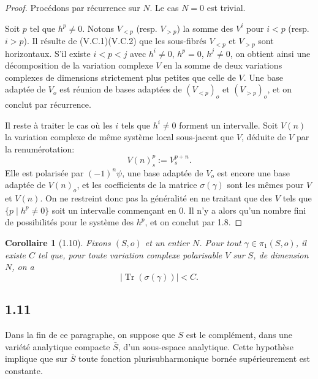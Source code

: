 \documentclass[12pt,a4paper]{article}
\theoremstyle{plain}
\newtheorem{corollary}{Corollaire}[section]
\theoremstyle{definition}
\DeclareMathOperator{\Tr}{Tr}
\begin{document}
\begin{proof}
Proc\'{e}dons par r\'{e}currence sur $N$. Le cas $N = 0$ est trivial.

Soit $p$ tel que $h^{p} \neq 0$. Notons $V_{<p}$ (resp. $V_{>p}$) la somme des $V^{i}$ pour $i < p$ (resp. $i > p$). Il r\'{e}sulte de (V.C.1)(V.C.2) que les sous-fibr\'{e}s $V_{<p}$ et $V_{>p}$ sont horizontaux. S'il existe $i < p < j$ avec $h^{i} \neq 0$, $h^{p} = 0$, $h^{j} \neq 0$, on obtient ainsi une d\'{e}composition de la variation complexe $V$ en la somme de deux variations complexes de dimensions strictement plus petites que celle de $V$. Une base adapt\'{e}e de $V_{o}$ est r\'{e}union de bases adapt\'{e}es de $(V_{<p})_{o}$ et $(V_{>p})_{o}$, et on conclut par r\'{e}currence.

Il reste \`{a} traiter le cas o\`{u} les $i$ tels que $h^{i} \neq 0$ forment un intervalle. Soit $V(n)$ la variation complexe de m\^{e}me syst\`{e}me local sous-jacent que $V$, d\'{e}duite de $V$ par la renum\'{e}rotation:
\[
V(n)_{s}^{p} := V_{s}^{p+n}.
\]
Elle est polaris\'{e}e par $(-1)^{n}\psi$, une base adapt\'{e}e de $V_{o}$ est encore une base adapt\'{e}e de $V(n)_{o}$, et les coefficients de la matrice $\sigma(\gamma)$ sont les m\^{e}mes pour $V$ et $V(n)$. On ne restreint donc pas la g\'{e}n\'{e}ralit\'{e} en ne traitant que des $V$ tels que $\{p \mid h^{p} \neq 0\}$ soit un intervalle commen\c{c}ant en $0$. Il n'y a alors qu'un nombre fini de possibilit\'{e}s pour le syst\`{e}me des $h^{p}$, et on conclut par 1.8.
\end{proof}

\begin{corollary}[1.10]
Fixons $(S,o)$ et un entier $N$. Pour tout $\gamma \in \pi_{1}(S,o)$, il existe $C$ tel que, pour toute variation complexe polarisable $V$ sur $S$, de dimension $N$, on a
\[
|\Tr(\sigma(\gamma))| < C.
\]
\end{corollary}

\subsection*{1.11}
Dans la fin de ce paragraphe, on suppose que $S$ est le compl\'{e}ment, dans une vari\'{e}t\'{e} analytique compacte $\bar{S}$, d'un sous-espace analytique. Cette hypoth\`{e}se implique que sur $\bar{S}$ toute fonction plurisubharmonique born\'{e}e sup\'{e}rieurement est constante.
\end{document}
